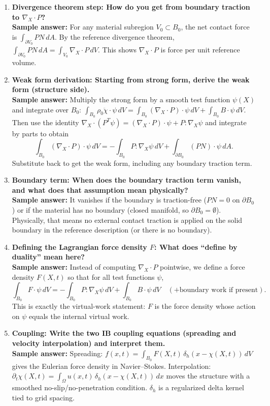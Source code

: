 \documentclass[12pt]{article}
\begin{document}
\begin{enumerate}
\item \textbf{Divergence theorem step: How do you get from boundary traction to $\nabla_X\cdot P$?}\\
\textbf{Sample answer:} For any material subregion $V_0\subset B_0$,
the net contact force is $\int_{\partial V_0} P N\, dA$. By the reference divergence theorem,
$\int_{\partial V_0} PN\, dA = \int_{V_0} \nabla_X\cdot P \, dV$. This shows $\nabla_X\cdot P$ is force per unit reference volume.

\item \textbf{Weak form derivation: Starting from strong form, derive the weak form (structure side).}\\
\textbf{Sample answer:} Multiply the strong form by a smooth test function $\psi(X)$ and integrate over $B_0$:
$\int_{B_0}\rho_0 \ddot{\chi}\cdot \psi\, dV = \int_{B_0} (\nabla_X\cdot P)\cdot \psi\, dV + \int_{B_0} B\cdot \psi\, dV$.
Then use the identity $\nabla_X\cdot(P^T\psi)=(\nabla_X\cdot P)\cdot\psi + P:\nabla_X\psi$ and integrate by parts to obtain
\[
\int_{B_0} (\nabla_X\cdot P)\cdot \psi\, dV
= -\int_{B_0} P:\nabla_X\psi\, dV + \int_{\partial B_0} (PN)\cdot \psi\, dA.
\]
Substitute back to get the weak form, including any boundary traction term.

\item \textbf{Boundary term: When does the boundary traction term vanish, and what does that assumption mean physically?}\\
\textbf{Sample answer:} It vanishes if the boundary is traction-free ($PN=0$ on $\partial B_0$) or if the material has no
boundary (closed manifold, so $\partial B_0=\emptyset$). Physically, that means no external contact traction is applied on the
solid boundary in the reference description (or there is no boundary).

\item \textbf{Defining the Lagrangian force density $F$: What does ``define by duality'' mean here?}\\
\textbf{Sample answer:} Instead of computing $\nabla_X\cdot P$ pointwise, we define a force density $F(X,t)$ so that for all
test functions $\psi$,
\[
\int_{B_0} F\cdot \psi\, dV
= -\int_{B_0} P:\nabla_X\psi\, dV + \int_{B_0} B\cdot \psi\, dV
\quad (+\text{boundary work if present}).
\]
This is exactly the virtual-work statement: $F$ is the force density whose action on $\psi$ equals the internal virtual work.

\item \textbf{Coupling: Write the two IB coupling equations (spreading and velocity interpolation) and interpret them.}\\
\textbf{Sample answer:} Spreading: $f(x,t)=\int_{B_0} F(X,t)\,\delta_h(x-\chi(X,t))\, dV$ gives the Eulerian force density
in Navier--Stokes. Interpolation: $\partial_t \chi(X,t)=\int_\Omega u(x,t)\,\delta_h(x-\chi(X,t))\, dx$ moves the structure
with a smoothed no-slip/no-penetration condition. $\delta_h$ is a regularized delta kernel tied to grid spacing.


\end{enumerate}
\end{document}
